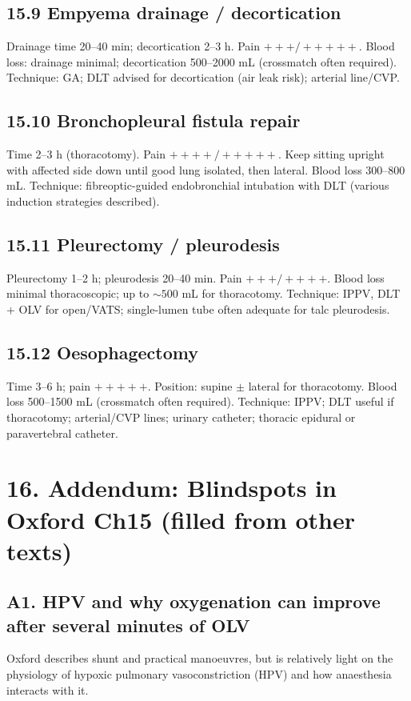 \documentclass[11pt,a4paper]{article}
\begin{document}
\subsection{15.9 Empyema drainage / decortication}
Drainage time 20--40 min; decortication 2--3 h. Pain \(+++/+++++\). Blood loss: drainage minimal; decortication 500--2000 mL (crossmatch often required). Technique: GA; DLT advised for decortication (air leak risk); arterial line/CVP.

\subsection{15.10 Bronchopleural fistula repair}
Time 2--3 h (thoracotomy). Pain \(++++/+++++\). Keep sitting upright with affected side down until good lung isolated, then lateral. Blood loss 300--800 mL. Technique: fibreoptic-guided endobronchial intubation with DLT (various induction strategies described).

\subsection{15.11 Pleurectomy / pleurodesis}
Pleurectomy 1--2 h; pleurodesis 20--40 min. Pain \(+++/++++\). Blood loss minimal thoracoscopic; up to \(\sim 500\) mL for thoracotomy. Technique: IPPV, DLT + OLV for open/VATS; single-lumen tube often adequate for talc pleurodesis.

\subsection{15.12 Oesophagectomy}
Time 3--6 h; pain \(+++++\). Position: supine \(\pm\) lateral for thoracotomy. Blood loss 500--1500 mL (crossmatch often required). Technique: IPPV; DLT useful if thoracotomy; arterial/CVP lines; urinary catheter; thoracic epidural or paravertebral catheter.

\section{16. Addendum: Blindspots in Oxford Ch15 (filled from other texts)}

\subsection{A1. HPV and why oxygenation can improve after several minutes of OLV}
Oxford describes shunt and practical manoeuvres, but is relatively light on the physiology of hypoxic pulmonary vasoconstriction (HPV) and how anaesthesia interacts with it.
\end{document}
